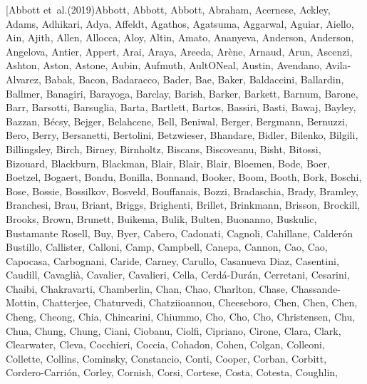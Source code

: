 \documentclass[times,tight]{aastex631}
\begin{document}
\begin{thebibliography}{}
\bibitem[{{Abbott} {et~al.}(2019){Abbott}, {Abbott}, {Abbott}, {Abraham},
  {Acernese}, {Ackley}, {Adams}, {Adhikari}, {Adya}, {Affeldt}, {Agathos},
  {Agatsuma}, {Aggarwal}, {Aguiar}, {Aiello}, {Ain}, {Ajith}, {Allen},
  {Allocca}, {Aloy}, {Altin}, {Amato}, {Ananyeva}, {Anderson}, {Anderson},
  {Angelova}, {Antier}, {Appert}, {Arai}, {Araya}, {Areeda}, {Ar{\`e}ne},
  {Arnaud}, {Arun}, {Ascenzi}, {Ashton}, {Aston}, {Astone}, {Aubin}, {Aufmuth},
  {AultONeal}, {Austin}, {Avendano}, {Avila-Alvarez}, {Babak}, {Bacon},
  {Badaracco}, {Bader}, {Bae}, {Baker}, {Baldaccini}, {Ballardin}, {Ballmer},
  {Banagiri}, {Barayoga}, {Barclay}, {Barish}, {Barker}, {Barkett}, {Barnum},
  {Barone}, {Barr}, {Barsotti}, {Barsuglia}, {Barta}, {Bartlett}, {Bartos},
  {Bassiri}, {Basti}, {Bawaj}, {Bayley}, {Bazzan}, {B{\'e}csy}, {Bejger},
  {Belahcene}, {Bell}, {Beniwal}, {Berger}, {Bergmann}, {Bernuzzi}, {Bero},
  {Berry}, {Bersanetti}, {Bertolini}, {Betzwieser}, {Bhandare}, {Bidler},
  {Bilenko}, {Bilgili}, {Billingsley}, {Birch}, {Birney}, {Birnholtz},
  {Biscans}, {Biscoveanu}, {Bisht}, {Bitossi}, {Bizouard}, {Blackburn},
  {Blackman}, {Blair}, {Blair}, {Blair}, {Bloemen}, {Bode}, {Boer}, {Boetzel},
  {Bogaert}, {Bondu}, {Bonilla}, {Bonnand}, {Booker}, {Boom}, {Booth}, {Bork},
  {Boschi}, {Bose}, {Bossie}, {Bossilkov}, {Bosveld}, {Bouffanais}, {Bozzi},
  {Bradaschia}, {Brady}, {Bramley}, {Branchesi}, {Brau}, {Briant}, {Briggs},
  {Brighenti}, {Brillet}, {Brinkmann}, {Brisson}, {Brockill}, {Brooks},
  {Brown}, {Brunett}, {Buikema}, {Bulik}, {Bulten}, {Buonanno}, {Buskulic},
  {Bustamante Rosell}, {Buy}, {Byer}, {Cabero}, {Cadonati}, {Cagnoli},
  {Cahillane}, {Calder{\'o}n Bustillo}, {Callister}, {Calloni}, {Camp},
  {Campbell}, {Canepa}, {Cannon}, {Cao}, {Cao}, {Capocasa}, {Carbognani},
  {Caride}, {Carney}, {Carullo}, {Casanueva Diaz}, {Casentini}, {Caudill},
  {Cavagli{\`a}}, {Cavalier}, {Cavalieri}, {Cella}, {Cerd{\'a}-Dur{\'a}n},
  {Cerretani}, {Cesarini}, {Chaibi}, {Chakravarti}, {Chamberlin}, {Chan},
  {Chao}, {Charlton}, {Chase}, {Chassande-Mottin}, {Chatterjee}, {Chaturvedi},
  {Chatziioannou}, {Cheeseboro}, {Chen}, {Chen}, {Chen}, {Cheng}, {Cheong},
  {Chia}, {Chincarini}, {Chiummo}, {Cho}, {Cho}, {Cho}, {Christensen}, {Chu},
  {Chua}, {Chung}, {Chung}, {Ciani}, {Ciobanu}, {Ciolfi}, {Cipriano}, {Cirone},
  {Clara}, {Clark}, {Clearwater}, {Cleva}, {Cocchieri}, {Coccia}, {Cohadon},
  {Cohen}, {Colgan}, {Colleoni}, {Collette}, {Collins}, {Cominsky},
  {Constancio}, {Conti}, {Cooper}, {Corban}, {Corbitt}, {Cordero-Carri{\'o}n},
  {Corley}, {Cornish}, {Corsi}, {Cortese}, {Costa}, {Cotesta}, {Coughlin},
}
\end{thebibliography}
\end{document}

